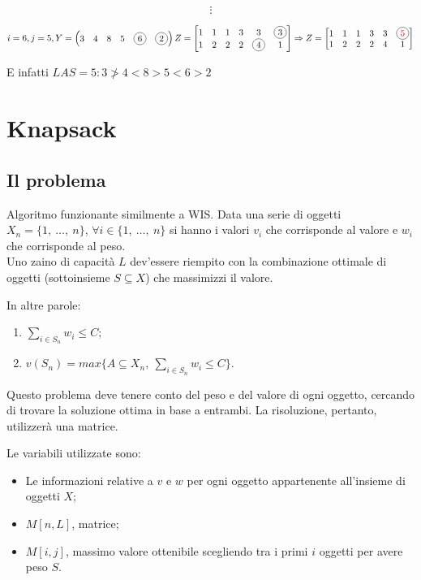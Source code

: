 \begin{example}{}{}
	$$\vdots$$

	$i = 6, j = 5, Y = \begin{pmatrix} 3 & 4 & 8 & 5 & \circled{6} & \circled{2} \end{pmatrix} \\
	Z = \begin{bmatrix}
		1 & 1 & 1 & 3 & 3 & \circled{3} \\
		1 & 2 & 2 & 2 & \circled{4} & 1
	\end{bmatrix} \Rightarrow Z = \begin{bmatrix}
		1 & 1 & 1 & 3 & 3 & \circled{\textcolor{red}{5}} \\
		1 & 2 & 2 & 2 & 4 & 1
	\end{bmatrix}$

	E infatti $LAS = 5: 3 \ngtr 4 < 8 > 5 < 6 > 2$
\end{example}

\newpage
\section{Knapsack}
\subsection{Il problema}
Algoritmo funzionante similmente a WIS. Data una serie di oggetti $X_n = \{1,\ \dots,\ n\}$, $\forall i \in \{1,\ \dots,\ n\}$ si hanno i valori $v_i$ che corrisponde al valore e $w_i$ che corrisponde al peso. \\
Uno zaino di capacità $L$ dev'essere riempito con la combinazione ottimale di oggetti (sottoinsieme $S \subseteq X$) che massimizzi il valore.

In altre parole:
\begin{enumerate}
	\item $\sum_{i \in S_n}w_i \leq C$;
	\item $v(S_n) = max\{A \subseteq X_n,\ \sum_{i \in S_n}w_i \leq C\}$.
\end{enumerate}

Questo problema deve tenere conto del peso e del valore di ogni oggetto, cercando di trovare la soluzione ottima in base a entrambi. La risoluzione, pertanto, utilizzerà una matrice.

Le variabili utilizzate sono:
\begin{itemize}
	\item Le informazioni relative a $v$ e $w$ per ogni oggetto appartenente all'insieme di oggetti $X$;
	\item $M[n, L]$, matrice;
	\item $M[i, j]$, massimo valore ottenibile scegliendo tra i primi $i$ oggetti per avere peso $S$.
\end{itemize}

